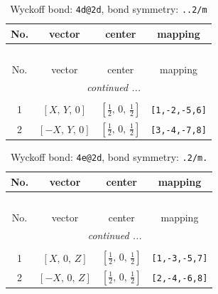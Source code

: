 \documentclass[fleqn,8pt]{jsarticle}
\begin{document}
\renewcommand{\arraystretch}{1.2}
\begin{longtable}{cccc}
\caption{Wyckoff bond: {\tt 4d@2d}, bond symmetry: {\tt ..2/m}}
 \\
 \hline \hline
No. & vector & center & mapping \\ \hline \endfirsthead

\multicolumn{3}{l}{\tablename\ \thetable{}} \\
 \hline \hline
No. & vector & center & mapping \\ \hline \endhead

 \hline \hline
\multicolumn{3}{r}{\footnotesize\it continued ...} \\ \endfoot

 \hline \hline
\multicolumn{3}{r}{} \\ \endlastfoot

1 & $\left[ X,\, Y,\, 0 \right]$ & $\left[ \frac{1}{2},\, 0,\, \frac{1}{2} \right]$ & {\tt [1,-2,-5,6]} \\ \hline
2 & $\left[ - X,\, Y,\, 0 \right]$ & $\left[ \frac{1}{2},\, 0,\, \frac{1}{2} \right]$ & {\tt [3,-4,-7,8]} \\
\end{longtable}
\renewcommand{\arraystretch}{1.2}
\begin{longtable}{cccc}
\caption{Wyckoff bond: {\tt 4e@2d}, bond symmetry: {\tt .2/m.}}
 \\
 \hline \hline
No. & vector & center & mapping \\ \hline \endfirsthead

\multicolumn{3}{l}{\tablename\ \thetable{}} \\
 \hline \hline
No. & vector & center & mapping \\ \hline \endhead

 \hline \hline
\multicolumn{3}{r}{\footnotesize\it continued ...} \\ \endfoot

 \hline \hline
\multicolumn{3}{r}{} \\ \endlastfoot

1 & $\left[ X,\, 0,\, Z \right]$ & $\left[ \frac{1}{2},\, 0,\, \frac{1}{2} \right]$ & {\tt [1,-3,-5,7]} \\ \hline
2 & $\left[ - X,\, 0,\, Z \right]$ & $\left[ \frac{1}{2},\, 0,\, \frac{1}{2} \right]$ & {\tt [2,-4,-6,8]} \\
\end{longtable}
\renewcommand{\arraystretch}{1.2}
\end{document}
